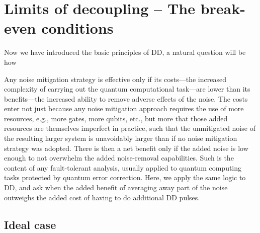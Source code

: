 \documentclass[pra,reprint,superscriptaddress]{revtex4-2}
\begin{document}




\newpage
\section{Limits of decoupling -- The break-even conditions}
Now we have introduced the basic principles of DD, a natural question will be 
how 


Any noise mitigation strategy is effective only if its costs---the increased complexity of carrying out the quantum computational task---are lower than its benefits---the increased ability to remove adverse effects of the noise. The costs enter not just because any noise mitigation approach requires the use of more resources, e.g., more gates, more qubits, etc., but more that those added resources are themselves imperfect in practice, such that the unmitigated noise of the resulting larger system is unavoidably larger than if no noise mitigation strategy was adopted. There is then a net benefit only if the added noise is low enough to not overwhelm the added noise-removal capabilities. Such is the content of any fault-tolerant analysis, usually applied to quantum computing tasks protected by quantum error correction. Here, we apply the same logic to DD, and ask when the added benefit of averaging away part of the noise outweighs the added cost of having to do additional DD pulses.




\subsection{Ideal case}
\end{document}
